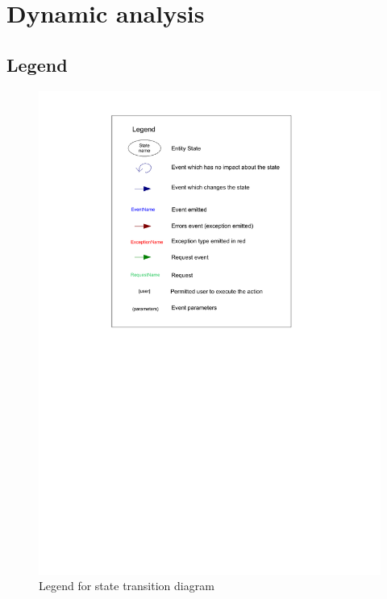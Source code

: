 \chapter{Dynamic analysis}

\section{Legend}
	\begin{figure}[ht]
			\begin{center}
				\includegraphics[width=\textwidth,  trim=2cm 14cm 2cm 1cm]{UML_figure/state_transition/dojo_logic/st_legend.pdf}
				\caption{Legend for state transition diagram}
			\end{center}
	\end{figure}
\newpage

